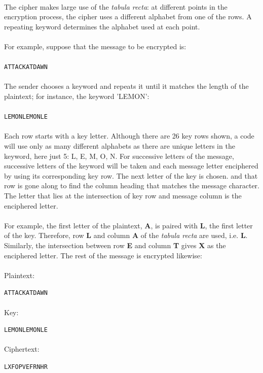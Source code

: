 \documentclass[Lau,binding=0.6cm,oneside]{sapthesis}
\begin{document}
\ \\
The cipher makes large use of the \textit{tabula recta}: at different points in the encryption process, the cipher uses a different alphabet from one of the rows. A repeating keyword determines the alphabet used at each point\supercite{vigenere3}.\\\\
For example, suppose that the message to be encrypted is: \\\\
\colorbox{gray!12}{\small{\texttt{ATTACKATDAWN}}}\\\\
The sender chooses a keyword and repeats it until it matches the length of the plaintext; for instance, the keyword 'LEMON':\\\\
\colorbox{gray!12}{\small{\texttt{LEMONLEMONLE}}}\\\\
Each row starts with a key letter. Although there are 26 key rows shown, a code will use only as many different alphabets as there are unique letters in the keyword, here just 5: {L, E, M, O, N}. For successive letters of the message, successive letters of the keyword will be taken and each message letter enciphered by using its corresponding key row. The next letter of the key is chosen. and that row is gone along to find the column heading that matches the message character. The letter that lies at the intersection of key row and message column is the enciphered letter.\\\\
For example, the first letter of the plaintext, \textbf{A}, is paired with \textbf{L}, the first letter of the key. Therefore, row \textbf{L} and column \textbf{A} of the \textit{tabula recta} are used, i.e. \textbf{L}. Similarly, the intersection between row \textbf{E} and column \textbf{T} gives \textbf{X} as the enciphered letter. The rest of the message is encrypted likewise:\\\\
Plaintext: \par\colorbox{gray!12}{\small{\texttt{ATTACKATDAWN}}}\\\\
Key: \par\colorbox{gray!12}{\small{\texttt{LEMONLEMONLE}}}\\\\
Ciphertext: \par\colorbox{gray!12}{\small{\texttt{LXFOPVEFRNHR}}}\\\\
\end{document}
